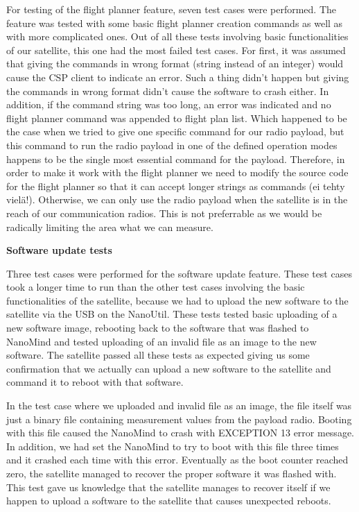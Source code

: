 \documentclass[english,12pt,a4paper,pdftex,elec,utf8]{aaltothesis}
\begin{document}
\par 
For testing of the flight planner feature, seven test cases were performed. The feature was tested with some basic flight planner creation commands as well as with more complicated ones. Out of all these tests involving basic functionalities of our satellite, this one had the most failed test cases. For first, it was assumed that giving the commands in wrong format (string instead of an integer) would cause the CSP client to indicate an error. Such a thing didn't happen but giving the commands in wrong format didn't cause the software to crash either. In addition, if the command string was too long, an error was indicated and no flight planner command was appended to flight plan list. Which happened to be the case when we tried to give one specific command for our radio payload, but this command to run the radio payload in one of the defined operation modes happens to be the single most essential command for the payload. Therefore, in order to make it work with the flight planner we need to modify the source code for the flight planner so that it can accept longer strings as commands (ei tehty vielä!). Otherwise, we can only use the radio payload when the satellite is in the reach of our communication radios. This is not preferrable as we would be radically limiting the area what we can measure.\par
\textbf{Software update tests}
\par 
Three test cases were performed for the software update feature. These test cases took a longer time to run than the other test cases involving the basic functionalities of the satellite, because we had to upload the new software to the satellite via the USB on the NanoUtil. These tests tested basic uploading of a new software image, rebooting back to the software that was flashed to NanoMind and tested uploading of an invalid file as an image to the new software. The satellite passed all these tests as expected giving us some confirmation that we actually can upload a new software to the satellite and command it to reboot with that software.\par
In the test case where we uploaded and invalid file as an image, the file itself was just a binary file containing measurement values from the payload radio. Booting with this file caused the NanoMind to crash with EXCEPTION 13 error message. In addition, we had set the NanoMind to try to boot with this file three times and it crashed each time with this error. Eventually as the boot counter reached zero, the satellite managed to recover the proper software it was flashed with. This test gave us knowledge that the satellite manages to recover itself if we happen to upload a software to the satellite that causes unexpected reboots.\par
\end{document}
